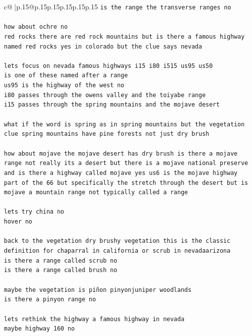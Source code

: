 \documentclass{article}
\begin{document}
{\begin{supertabular}{c@{$\;$}|p{.15\linewidth}@{}p{.15\linewidth}p{.15\linewidth}p{.15\linewidth}p{.15\linewidth}p{.15\linewidth}}
{{{\texttt{is the range the transverse ranges no} \\
\\ 
\texttt{how about ochre no} \\
\texttt{red rocks there are red rock mountains but is there a famous highway named red rocks yes in colorado but the clue says nevada} \\
\\ 
\texttt{lets focus on nevada famous highways i15 i80 i515 us95 us50} \\
\texttt{is one of these named after a range} \\
\texttt{us95 is the highway of the west no} \\
\texttt{i80 passes through the owens valley and the toiyabe range} \\
\texttt{i15 passes through the spring mountains and the mojave desert} \\
\\ 
\texttt{what if the word is spring as in spring mountains but the vegetation clue spring mountains have pine forests not just dry brush} \\
\\ 
\texttt{how about mojave the mojave desert has dry brush is there a mojave range not really its a desert but there is a mojave national preserve and is there a highway called mojave yes us6 is the mojave highway part of the 66 but specifically the stretch through the desert but is mojave a mountain range not typically called a range} \\
\\ 
\texttt{lets try china no} \\
\texttt{hover no} \\
\\ 
\texttt{back to the vegetation dry brushy vegetation this is the classic definition for chaparral in california or scrub in nevadaarizona} \\
\texttt{is there a range called scrub no} \\
\texttt{is there a range called brush no} \\
\\ 
\texttt{maybe the vegetation is piñon pinyonjuniper woodlands} \\
\texttt{is there a pinyon range no} \\
\\ 
\texttt{lets rethink the highway a famous highway in nevada} \\
\texttt{maybe highway 160 no} \\
}}}
\end{supertabular}}
\end{document}
